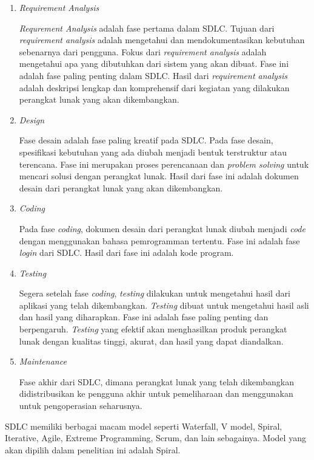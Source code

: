 \begin{enumerate}
	
	\item \textit{Requirement Analysis}

	\textit{Requrement Analysis} adalah fase pertama dalam SDLC. Tujuan dari \textit{requirement analysis} adalah mengetahui dan mendokumentasikan kebutuhan sebenarnya dari pengguna. Fokus dari \textit{requirement analysis} adalah mengetahui apa yang dibutuhkan dari sistem yang akan dibuat. Fase ini adalah fase paling penting dalam SDLC. Hasil dari \textit{requirement analysis} adalah deskripsi lengkap dan komprehensif dari kegiatan yang dilakukan perangkat lunak yang akan dikembangkan.

	\item \textit{Design}

	Fase desain adalah fase paling kreatif pada SDLC. Pada fase desain, spesifikasi kebutuhan yang ada diubah menjadi bentuk terstruktur atau terencana. Fase ini merupakan proses perencanaan dan \textit{problem solving} untuk mencari solusi dengan perangkat lunak. Hasil dari fase ini adalah dokumen desain dari perangkat lunak yang akan dikembangkan.

	\item \textit{Coding}

	Pada fase \textit{coding}, dokumen desain dari perangkat lunak diubah menjadi \textit{code} dengan menggunakan bahasa pemrogramman tertentu. Fase ini adalah fase \textit{login} dari SDLC. Hasil dari fase ini adalah kode program.

	\item \textit{Testing}

	Segera setelah fase \textit{coding}, \textit{testing} dilakukan untuk mengetahui hasil dari aplikasi yang telah dikembangkan. \textit{Testing} dibuat untuk mengetahui hasil asli dan hasil yang diharapkan. Fase ini adalah fase paling penting dan berpengaruh. \textit{Testing} yang efektif akan menghasilkan produk perangkat lunak dengan kualitas tinggi, akurat, dan hasil yang dapat diandalkan.

	\item \textit{Maintenance}

	Fase akhir dari SDLC, dimana perangkat lunak yang telah dikembangkan didistribusikan ke pengguna akhir untuk pemeliharaan dan menggunakan untuk pengoperasian seharusnya.
\end{enumerate}

	SDLC memiliki berbagai macam model seperti Waterfall, V model, Spiral, Iterative, Agile, Extreme Programming, Scrum, dan lain sebagainya. Model yang akan dipilih dalam penelitian ini adalah Spiral. 

